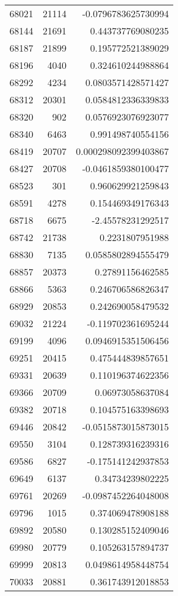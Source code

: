 \begin{tabular}{r | r | r}
68021 & 21114 & -0.0796783625730994 \\
68144 & 21691 & 0.443737769080235 \\
68187 & 21899 & 0.195772521389029 \\
68196 & 4040 & 0.324610244988864 \\
68292 & 4234 & 0.0803571428571427 \\
68312 & 20301 & 0.0584812336339833 \\
68320 & 902 & 0.0576923076923077 \\
68340 & 6463 & 0.991498740554156 \\
68419 & 20707 & 0.000298092399403867 \\
68427 & 20708 & -0.0461859380100477 \\
68523 & 301 & 0.960629921259843 \\
68591 & 4278 & 0.154469349176343 \\
68718 & 6675 & -2.45578231292517 \\
68742 & 21738 & 0.2231807951988 \\
68830 & 7135 & 0.0585802894555479 \\
68857 & 20373 & 0.27891156462585 \\
68866 & 5363 & 0.246706586826347 \\
68929 & 20853 & 0.242690058479532 \\
69032 & 21224 & -0.119702361695244 \\
69199 & 4096 & 0.0946915351506456 \\
69251 & 20415 & 0.475444839857651 \\
69331 & 20639 & 0.110196374622356 \\
69366 & 20709 & 0.06973058637084 \\
69382 & 20718 & 0.104575163398693 \\
69446 & 20842 & -0.0515873015873015 \\
69550 & 3104 & 0.128739316239316 \\
69586 & 6827 & -0.175141242937853 \\
69649 & 6137 & 0.34734239802225 \\
69761 & 20269 & -0.0987452264048008 \\
69796 & 1015 & 0.374069478908188 \\
69892 & 20580 & 0.130285152409046 \\
69980 & 20779 & 0.105263157894737 \\
69999 & 20813 & 0.0498614958448754 \\
70033 & 20881 & 0.361743912018853 \\

\end{tabular}
